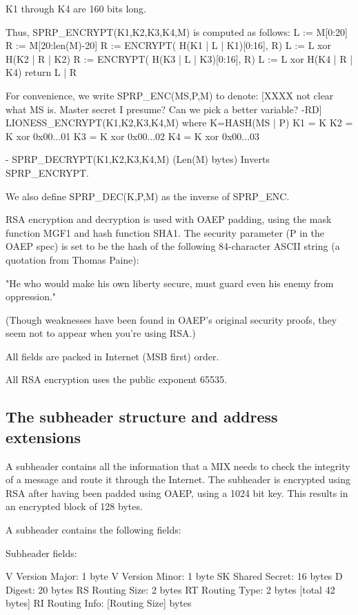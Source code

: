   K1 through K4 are 160 bits long.

  Thus, SPRP_ENCRYPT(K1,K2,K3,K4,M) is computed as follows:
            L := M[0:20]
            R := M[20:len(M)-20]
            R := ENCRYPT( H(K1 | L | K1)[0:16], R)
            L := L xor H(K2 | R | K2)
            R := ENCRYPT( H(K3 | L | K3)[0:16], R)
            L := L xor H(K4 | R | K4) 
            return L | R

  For convenience, we write SPRP_ENC(MS,P,M) to denote:
    [XXXX not clear what MS is. Master secret I presume? Can we pick a
       better variable? -RD]
       LIONESS_ENCRYPT(K1,K2,K3,K4,M)
       where K=HASH(MS | P)
             K1 = K
             K2 = K xor 0x00...01
             K3 = K xor 0x00...02
             K4 = K xor 0x00...03

- SPRP_DECRYPT(K1,K2,K3,K4,M) (Len(M) bytes) Inverts SPRP_ENCRYPT.

  We also define SPRP_DEC(K,P,M) as the inverse of SPRP_ENC.
    
RSA encryption and decryption is used with OAEP padding, using the
mask function MGF1 and hash function SHA1.  The security parameter (P
in the OAEP spec) is set to be the hash of the following 84-character
ASCII string (a quotation from Thomas Paine):

     "He who would make his own liberty secure, must guard even his
      enemy from oppression." 

(Though weaknesses have been found in OAEP's original security proofs,
they seem not to appear when you're using RSA.)

All fields are packed in Internet (MSB first) order.

All RSA encryption uses the public exponent 65535.

\subsection{The subheader structure and address extensions}

A subheader contains all the information that a MIX needs to check the
integrity of a message and route it through the Internet. The subheader
is encrypted using RSA after having been padded using OAEP, using a 1024
bit key. This results in an encrypted block of 128 bytes.

A subheader contains the following fields:

Subheader fields:

V   Version Major:   1 byte
V   Version Minor:   1 byte
SK  Shared Secret:   16 bytes
D   Digest:          20 bytes
RS  Routing Size:    2 bytes 
RT  Routing Type:    2 bytes [total 42 bytes]
RI  Routing Info:    [Routing Size] bytes


